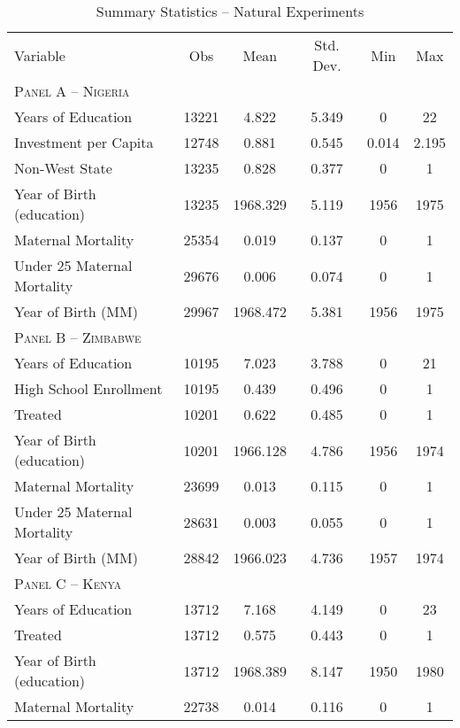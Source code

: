 \begin{table}[htpb!]											
\begin{center}											
\caption{Summary Statistics -- Natural Experiments}											
\label{MMRtab:sumstatsexperiment}											
\begin{tabular}{l c c c c c}											
& & & & & \\											
\toprule											
Variable	&	Obs	&	Mean	&	Std. Dev.	&	Min	&	Max	\\
\midrule
\multicolumn{6}{l}{\textsc{Panel A – Nigeria}}  \\											
Years of Education	&	13221	&	4.822	&	5.349	&	0	&	22	\\
Investment per Capita	&	12748	&	0.881	&	0.545	&	0.014	&	2.195	\\
Non-West State	&	13235	&	0.828	&	0.377	&	0	&	1	\\
Year of Birth (education)	&	13235	&	1968.329	&	5.119	&	1956	&	1975	\\
Maternal Mortality	&	25354	&	0.019	&	0.137	&	0	&	1	\\
Under 25 Maternal Mortality	&	29676	&	0.006	&	0.074	&	0	&	1	\\
Year of Birth (MM)	&	29967	&	1968.472	&	5.381	&	1956	&	1975	\\
\midrule											
\multicolumn{6}{l}{\textsc{Panel B – Zimbabwe}}  \\											
Years of Education	&	10195	&	7.023	&	3.788	&	0	&	21	\\
High School Enrollment	&	10195	&	0.439	&	0.496	&	0	&	1	\\
Treated	&	10201	&	0.622	&	0.485	&	0	&	1	\\
Year of Birth (education)	&	10201	&	1966.128	&	4.786	&	1956	&	1974	\\
Maternal Mortality	&	23699	&	0.013	&	0.115	&	0	&	1	\\
Under 25 Maternal Mortality	&	28631	&	0.003	&	0.055	&	0	&	1	\\
Year of Birth (MM)	&	28842	&	1966.023	&	4.736	&	1957	&	1974	\\
\midrule											
\multicolumn{6}{l}{\textsc{Panel C – Kenya}}  \\											
Years of Education	&	13712	&	7.168	&	4.149	&	0	&	23	\\
Treated	&	13712	&	0.575	&	0.443	&	0	&	1	\\
Year of Birth (education)	&	13712	&	1968.389	&	8.147	&	1950	&	1980	\\
Maternal Mortality	&	22738	&	0.014	&	0.116	&	0	&	1	\\

\end{tabular}
\end{center}
\end{table}
